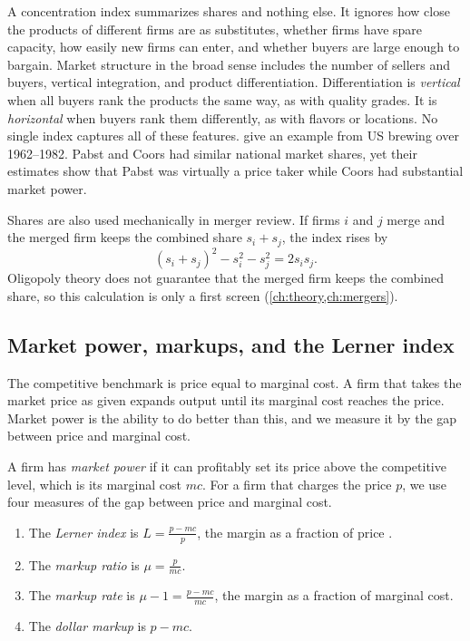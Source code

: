 \begin{remark}\label{rem:01-concentration-limits}
A concentration index summarizes shares and nothing else. It ignores how close the products of different firms
are as substitutes, whether firms have spare capacity, how easily new firms can enter, and whether buyers are
large enough to bargain. Market structure in the broad sense includes the number of sellers and buyers,
vertical integration, and product differentiation. Differentiation is \emph{vertical} when all buyers rank the
products the same way, as with quality grades. It is \emph{horizontal} when buyers rank them differently, as
with flavors or locations. No single index captures all of these features. \citet[p.~283]{BakerBresnahan1988}
give an example from US brewing over 1962--1982. Pabst and Coors had similar national market shares, yet
their estimates show that Pabst was virtually a price taker while Coors had substantial market power.

Shares are also used mechanically in merger review. If firms $i$ and $j$ merge and the merged firm keeps the
combined share $s_i + s_j$, the index rises by
\[
  (s_i + s_j)^2 - s_i^2 - s_j^2 = 2 s_i s_j .
\]
Oligopoly theory does not guarantee that the merged firm keeps the combined share, so this calculation is only
a first screen (\cref{ch:theory,ch:mergers}).
\end{remark}

\subsection{Market power, markups, and the Lerner index}\label{sec:01-lerner}

The competitive benchmark is price equal to marginal cost. A firm that takes the market price as given expands
output until its marginal cost reaches the price. Market power is the ability to do better than this, and we
measure it by the gap between price and marginal cost.

\begin{definition}\label{def:01-market-power}
A firm has \emph{market power} if it can profitably set its price above the competitive level, which is its
marginal cost $mc$. For a firm that charges the price $p$, we use four measures of the gap between price and
marginal cost.
\begin{enumerate}[label=(\roman*)]
  \item The \emph{Lerner index} is $L = \frac{p - mc}{p}$, the margin as a fraction of price
  \citep{Lerner1934}.
  \item The \emph{markup ratio} is $\mu = \frac{p}{mc}$.
  \item The \emph{markup rate} is $\mu - 1 = \frac{p - mc}{mc}$, the margin as a fraction of marginal cost.
  \item The \emph{dollar markup} is $p - mc$.
\end{enumerate}
\end{definition}


